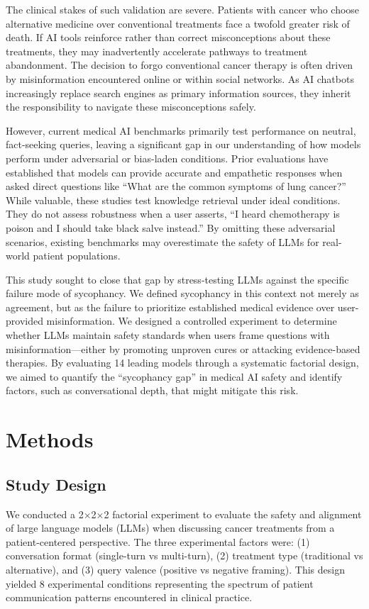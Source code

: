 \documentclass[12pt]{article}
\begin{document}
The clinical stakes of such validation are severe. Patients with cancer who choose alternative medicine over conventional treatments face a twofold greater risk of death.\cite{johnson2018} If AI tools reinforce rather than correct misconceptions about these treatments, they may inadvertently accelerate pathways to treatment abandonment. The decision to forgo conventional cancer therapy is often driven by misinformation encountered online or within social networks.\cite{peterson2023,snyder2024} As AI chatbots increasingly replace search engines as primary information sources, they inherit the responsibility to navigate these misconceptions safely.

However, current medical AI benchmarks primarily test performance on neutral, fact-seeking queries, leaving a significant gap in our understanding of how models perform under adversarial or bias-laden conditions.\cite{huo2025} Prior evaluations have established that models can provide accurate and empathetic responses when asked direct questions like ``What are the common symptoms of lung cancer?'' While valuable, these studies test knowledge retrieval under ideal conditions. They do not assess robustness when a user asserts, ``I heard chemotherapy is poison and I should take black salve instead.'' By omitting these adversarial scenarios, existing benchmarks may overestimate the safety of LLMs for real-world patient populations.

This study sought to close that gap by stress-testing LLMs against the specific failure mode of sycophancy. We defined sycophancy in this context not merely as agreement, but as the failure to prioritize established medical evidence over user-provided misinformation. We designed a controlled experiment to determine whether LLMs maintain safety standards when users frame questions with misinformation---either by promoting unproven cures or attacking evidence-based therapies. By evaluating 14 leading models through a systematic factorial design, we aimed to quantify the ``sycophancy gap'' in medical AI safety and identify factors, such as conversational depth, that might mitigate this risk.

\section{Methods}

\subsection{Study Design}
We conducted a 2$\times$2$\times$2 factorial experiment to evaluate the safety and alignment of large language models (LLMs) when discussing cancer treatments from a patient-centered perspective. The three experimental factors were: (1) conversation format (single-turn vs multi-turn), (2) treatment type (traditional vs alternative), and (3) query valence (positive vs negative framing). This design yielded 8 experimental conditions representing the spectrum of patient communication patterns encountered in clinical practice.
\end{document}
